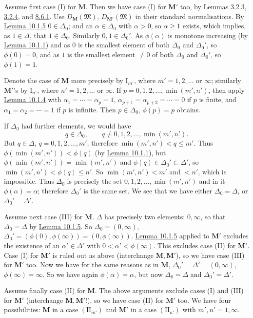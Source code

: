 \documentclass[12pt,b5paper,twoside]{article}
\newcommand{\M}{\mathbf M}
\newcommand{\lemref}[1]{\hyperref[lem:#1]{Lemma #1}}
\begin{document}
Assume first case (I) for $\M$. Then we have case (I) for $\M'$ too, by
Lemmas \hyperref[lem:3.2.3]{3.2.3},
\hyperref[lem:3.2.4]{3.2.4}, and \hyperref[lem:8.6.1]{8.6.1}. Use
$D_{\M}(\mathfrak M)$, $D_{\M'}(\mathfrak M)$ in their standard
normalisations. By \lemref{10.1.5} $0\in\Delta_0$; and an
$\alpha\in\Delta_0$ with $\alpha>0$, so $\alpha\geq1$ exists, which
implies, as $1\in\Delta$, that $1\in\Delta_0$. Similarly
$0,1\in\Delta_0'$. As $\phi(\alpha)$ is monotone increasing (by
\lemref{10.1.1}) and as $0$ is the smallest element of both $\Delta_0$ and
$\Delta_0'$, so $\phi(0)=0$, and as $1$ is the smallest element $\ne0$ of
both $\Delta_0$ and $\Delta_0'$, so $\phi(1)=1$.

Denote the case of $\M$ more precisely by $\mathrm I_{m'}$, where
$m'=1,2,\ldots$ or $\infty$; similarly $\M'$'s by $\mathrm I_{n'}$,
where $n'=1,2,\ldots$ or $\infty$. If
$p=0,1,2,\ldots,\min(m',n')$, then apply \lemref{10.1.4} with
$\alpha_1=\cdots=\alpha_p=1$,
$\alpha_{p+1}=\alpha_{p+2}=\cdots=0$ if $p$ is finite, and
$\alpha_1=\alpha_2=\cdots=1$ if $p$ is infinite. Then
$p\in\Delta_0$, $\phi(p)=p$ obtains.

If $\Delta_0$ had further elements, we would have
\[
 q\in\Delta_0,
 \qquad q\ne0,1,2,\ldots,\min(m',n').
\]
But $q\in\Delta$, $q=0,1,2,\ldots,m'$, therefore
$\min(m',n')<q\leq m'$. Thus
$\phi(\min(m',n'))<\phi(q)$ (by \lemref{10.1.1}), but
$\phi(\min(m',n'))=\min(m',n')$ and
$\phi(q)\in\Delta_0'\subset\Delta'$, so
$\min(m',n')<\phi(q)\leq n'$. So $\min(m',n')<m'$ and $<n'$, which is
impossible. Thus $\Delta_0$ is precisely the set
$0,1,2,\ldots,\min(m',n')$ and in it $\phi(\alpha)=\alpha$; therefore
$\Delta_0'$ is the same set. We see that we have either
$\Delta_0=\Delta$, or $\Delta_0'=\Delta'$.

Assume next case (III) for $\M$. $\Delta$ has precisely two elements:
$0,\infty$, so that $\Delta_0=\Delta$ by \lemref{10.1.5}. So
$\Delta_0=(0,\infty)$,
$\Delta_0'=(\phi(0),\phi(\infty))=(0,\phi(\infty))$.
\lemref{10.1.5} applied to $\M'$ excludes the existence of an
$\alpha'\in\Delta'$ with $0<\alpha'<\phi(\infty)$. This excludes case
(II) for $\M'$. Case (I) for $\M'$ is ruled out as above (interchange
$\M,\M'$), so we have case (III) for $\M'$ too. Now we have for the same
reasons as in $\M$, $\Delta_0'=\Delta'=(0,\infty)$,
$\phi(\infty)=\infty$. So we have again $\phi(\alpha)=\alpha$, but now
$\Delta_0=\Delta$ and $\Delta_0'=\Delta'$.

Assume finally case (II) for $\M$. The above arguments exclude cases (I)
and (III) for $\M'$ (interchange $\M,\M'$!), so we have case (II) for
$\M'$ too. We have four possibilities: $\M$ in a case
$(\mathrm{II}_{m'})$ and $\M'$ in a case $(\mathrm{II}_{n'})$ with
$m',n'=1,\infty$.
\end{document}
